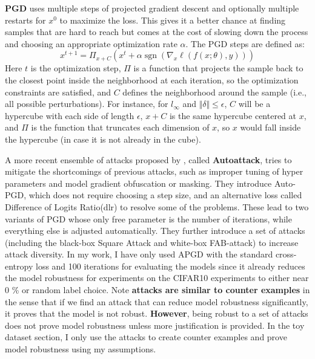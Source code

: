 \documentclass[../thesis.tex]{subfiles}
\begin{document}
	\textbf{PGD} \cite{adv_training_madry} uses multiple steps of projected gradient descent and optionally multiple restarts for $x^0$ to maximize the loss. This gives it a better chance at finding samples that are hard to reach but comes at the cost of slowing down the process and choosing an appropriate optimization rate $\alpha$. The PGD steps are defined as:
	\begin{equation}
	x^{t+1}=\Pi_{x+C}\left(x^{t}+\alpha \operatorname{sgn}\left(\nabla_{x} \ell(f(x;\theta),y)\right)\right)
	\end{equation}
	Here $t$ is the optimization step, $\Pi$ is a function that projects the sample back to the closest point inside the neighborhood at each iteration, so the optimization constraints are satisfied, and $C$ defines the neighborhood around the sample (i.e., all possible perturbations). For instance, for $l_{\infty}$ and $\Vert \delta \Vert \leq \epsilon$, $C$ will be a hypercube with each side of length $\epsilon$, $x+C$ is the same hypercube centered at $x$, and $\Pi$ is the function that truncates each dimension of $x$, so $x$ would fall inside the hypercube (in case it is not already in the cube). 
	
	A more recent ensemble of attacks proposed by \cite{autoattack}, called \textbf{Autoattack}, tries to mitigate the shortcomings of previous attacks, such as improper tuning of hyper parameters and model gradient obfuscation or masking. They introduce Auto-PGD, which does not require choosing a step size, and an alternative loss called Difference of Logits Ratio(dlr) to resolve some of the problems. These lead to two variants of PGD whose only free parameter is the number of iterations, while everything else is adjusted automatically. They further introduce a set of attacks (including the black-box Square Attack and white-box FAB-attack) to increase attack diversity. In my work, I have only used APGD with the standard cross-entropy loss and 100 iterations for evaluating the models since it already reduces the model robustness for experiments on the CIFAR10 experiments to either near 0 \% or random label choice. Note \textbf{attacks are similar to counter examples} in the sense that if we find an attack that can reduce model robustness significantly, it proves that the model is not robust. \textbf{However}, being robust to a set of attacks does not prove model robustness unless more justification is provided. In the toy dataset section, I only use the attacks to create counter examples and prove model robustness using my assumptions.     
	
\end{document}
